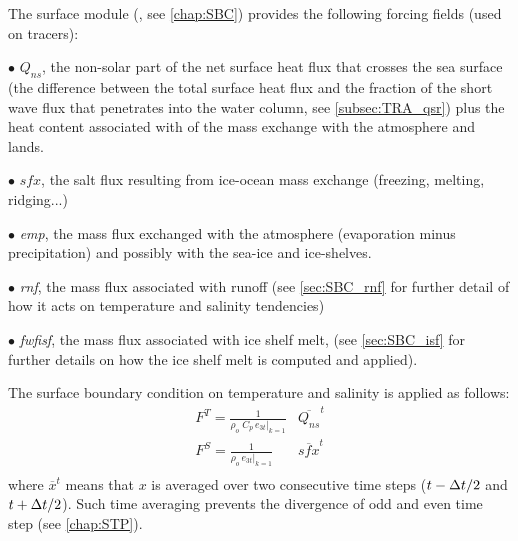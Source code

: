 \documentclass[../main/NEMO_manual]{subfiles}
\begin{document}
The surface module (, see \autoref{chap:SBC}) provides the following forcing fields (used on tracers):

$\bullet$ $Q_{ns}$, the non-solar part of the net surface heat flux that crosses the sea surface
(\ie the difference between the total surface heat flux and the fraction of the short wave flux that 
penetrates into the water column, see \autoref{subsec:TRA_qsr})
plus the heat content associated with of the mass exchange with the atmosphere and lands.

$\bullet$ $\textit{sfx}$, the salt flux resulting from ice-ocean mass exchange (freezing, melting, ridging...)

$\bullet$ \textit{emp}, the mass flux exchanged with the atmosphere (evaporation minus precipitation) and
possibly with the sea-ice and ice-shelves.

$\bullet$ \textit{rnf}, the mass flux associated with runoff
(see \autoref{sec:SBC_rnf} for further detail of how it acts on temperature and salinity tendencies)

$\bullet$ \textit{fwfisf}, the mass flux associated with ice shelf melt,
(see \autoref{sec:SBC_isf} for further details on how the ice shelf melt is computed and applied).

The surface boundary condition on temperature and salinity is applied as follows:
\begin{equation}
  \label{eq:tra_sbc}
  \begin{aligned}
    &F^T = \frac{ 1 }{\rho_o \;C_p \,\left. e_{3t} \right|_{k=1} }  &\overline{ Q_{ns}       }^t  & \\
    & F^S =\frac{ 1 }{\rho_o  \,      \left. e_{3t} \right|_{k=1} }  &\overline{ \textit{sfx} }^t   & \\
  \end{aligned}
\end{equation} 
where $\overline{x }^t$ means that $x$ is averaged over two consecutive time steps ($t-\Delta t/2$ and $t+\Delta t/2$).
Such time averaging prevents the divergence of odd and even time step (see \autoref{chap:STP}).
\end{document}
